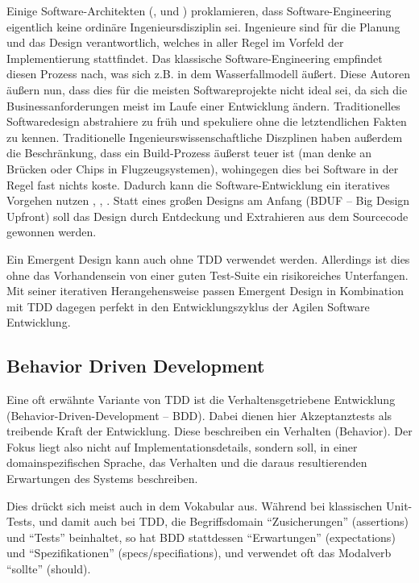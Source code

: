Einige Software-Architekten (\citeauthor*{neal_ford_emergent_2010}, \citeauthor*{jack_reeves_three_1992} und \citeauthor{glenn_vanderburg_real_2010}) proklamieren, dass Software-Engineering eigentlich keine ordinäre Ingenieursdisziplin sei. Ingenieure sind für die Planung und das Design verantwortlich, welches in aller Regel im Vorfeld der Implementierung stattfindet. Das klassische Software-Engineering empfindet diesen Prozess nach, was sich z.B. in dem Wasserfallmodell äußert. Diese Autoren äußern nun, dass dies für die meisten Softwareprojekte nicht ideal sei, da sich die Businessanforderungen meist im Laufe einer Entwicklung ändern. Traditionelles Softwaredesign abstrahiere zu früh und spekuliere ohne die letztendlichen Fakten zu kennen. Traditionelle Ingenieurswissenschaftliche Diszplinen haben außerdem die Beschränkung, dass ein Build-Prozess äußerst teuer ist (man denke an Brücken oder Chips in Flugzeugsystemen), wohingegen dies bei Software in der Regel fast nichts koste. Dadurch kann die Software-Entwicklung ein iteratives Vorgehen nutzen \citep{neal_ford_emergent_2010}, \citep{glenn_vanderburg_real_2010}, \citep{jack_reeves_three_1992}. Statt eines großen Designs am Anfang (BDUF -- Big Design Upfront) soll das Design durch Entdeckung und Extrahieren aus dem Sourcecode gewonnen werden.


Ein Emergent Design kann auch ohne TDD verwendet werden. Allerdings ist dies ohne das Vorhandensein von einer guten Test-Suite ein risikoreiches Unterfangen.
Mit seiner iterativen Herangehensweise passen Emergent Design in Kombination mit TDD dagegen perfekt in den Entwicklungszyklus der Agilen Software Entwicklung.




  \subsection{Behavior Driven Development}
  
  Eine oft erwähnte Variante von TDD ist die Verhaltensgetriebene Entwicklung (Behavior-Driven-Development -- BDD). Dabei dienen hier Akzeptanztests als treibende Kraft der Entwicklung. Diese beschreiben ein Verhalten (Behavior). Der Fokus liegt also nicht auf Implementationsdetails, sondern soll, in einer domainspezifischen Sprache, das Verhalten und die daraus resultierenden Erwartungen des Systems beschreiben.
  
  Dies drückt sich meist auch in dem Vokabular aus. Während bei klassischen Unit-Tests, und damit auch bei TDD, die Begriffsdomain  "`Zusicherungen"' (assertions) und "`Tests"' beinhaltet, so hat BDD stattdessen "`Erwartungen"' (expectations) und "`Spezifikationen"' (specs/specifiations), und verwendet oft das Modalverb "`sollte"' (should).
  
